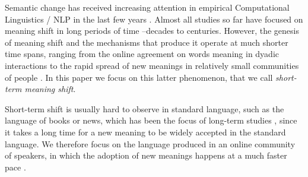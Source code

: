 Semantic change has received
increasing attention in empirical Computational Linguistics / NLP in
the last few years \cite{tang2018state}. Almost all studies so far have focused on meaning shift in
long periods of time --decades to centuries. However, the genesis of meaning shift and the
mechanisms that produce it operate at much shorter time spans, ranging
from the online agreement on words meaning in dyadic interactions
\cite{brennan1996conceptual} to the rapid spread of new meanings in
relatively small communities of people \cite{del2017semantic}. In this
paper we focus on this latter phenomenon, that we call \textit{short-term
meaning shift}.

Short-term shift is usually hard to observe in standard language, such
as the language of books or news, which has been the focus of
long-term studies \cite{hamilton2016diachronic,kulkarni2015statistically}, since
it takes a long time for a new meaning to be widely accepted in the standard language. 
We therefore focus on the language produced in an online community of speakers, in which the 
adoption of new meanings happens at a much faster pace \cite{Clark96,hasan2009}.

